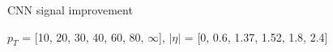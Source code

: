 \begin{frame}{CNN signal improvement}
\begin{figure}
    \centering
\end{figure}
$p_T$ = [10, 20, 30, 40, 60, 80, $\infty$], $|\eta|$ = [0, 0.6, 1.37, 1.52, 1.8, 2.4]
\end{frame}

